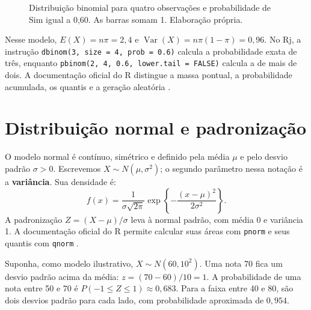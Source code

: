 \begin{figure}[H]
\centering
{}
\caption{Distribuição binomial para quatro observações e probabilidade de Sim igual a 0,60. As barras somam 1. Elaboração própria.}
\label{fig:binomial-quatro}
\end{figure}

Nesse modelo, $E(X)=n\pi=2{,}4$ e $\operatorname{Var}(X)=n\pi(1-\pi)=0{,}96$. No Rj, a instrução \texttt{dbinom(3, size = 4, prob = 0.6)} calcula a probabilidade exata de três, enquanto \texttt{pbinom(2, 4, 0.6, lower.tail = FALSE)} calcula a de mais de dois. A documentação oficial do R distingue a massa pontual, a probabilidade acumulada, os quantis e a geração aleatória \parencite{RDistribuicaoBinomial}.

\section{Distribuição normal e padronização}

O modelo normal é contínuo, simétrico e definido pela média $\mu$ e pelo desvio padrão $\sigma>0$. Escrevemos $X\sim N(\mu,\sigma^2)$; o segundo parâmetro nessa notação é a \textbf{variância}. Sua densidade é:
\[
f(x)=\frac{1}{\sigma\sqrt{2\pi}}
\exp\left\{-\frac{(x-\mu)^2}{2\sigma^2}\right\}.
\]
A padronização $Z=(X-\mu)/\sigma$ leva à normal padrão, com média 0 e variância 1. A documentação oficial do R permite calcular suas áreas com \texttt{pnorm} e seus quantis com \texttt{qnorm} \parencite{RNormal}.

Suponha, como modelo ilustrativo, $X\sim N(60,10^2)$. Uma nota 70 fica um desvio padrão acima da média: $z=(70-60)/10=1$. A probabilidade de uma nota entre 50 e 70 é $P(-1\leq Z\leq1)\approx0{,}683$. Para a faixa entre 40 e 80, são dois desvios padrão para cada lado, com probabilidade aproximada de $0{,}954$.

